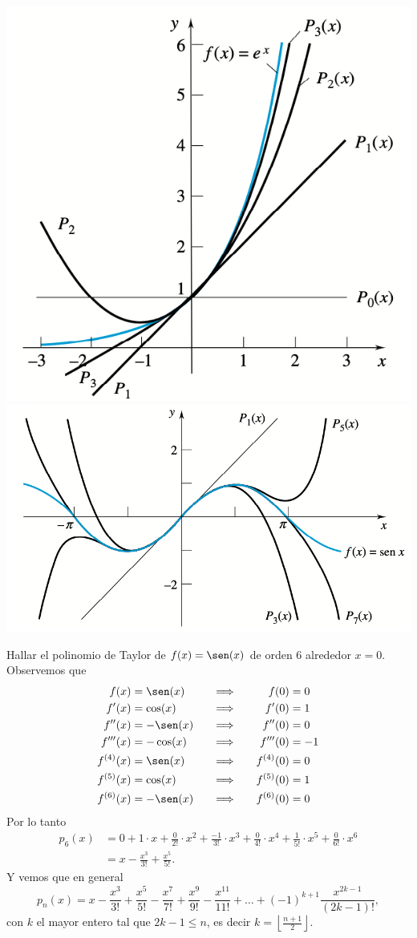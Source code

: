 \begin{center}
  \includegraphics[width=.4\textwidth]{pics/taylor-exp.png}
  \hfil
  \includegraphics[width=.59\textwidth]{pics/taylor-sen.png}
\end{center}

\begin{example}
Hallar el polinomio de Taylor de $f(x) = \sen(x)$ de orden 6 alrededor $x=0$.
Observemos que
\[
\begin{aligned}
 f(x) &= \sen(x)  \quad &\Longrightarrow & &\quad f(0)  &= 0 \\
 f'(x) &= \cos(x) \quad &\Longrightarrow& & \quad f'(0) &= 1 \\
 f''(x) &= -\sen(x) \quad &\Longrightarrow& & \quad f''(0) &= 0 \\
 f'''(x) &= -\cos(x) \quad &\Longrightarrow& & \quad f'''(0) &= -1 \\
 f^{(4)}(x) &= \sen(x) \quad &\Longrightarrow& & \quad f^{(4)}(0) &= 0 \\
 f^{(5)}(x) &= \cos(x) \quad &\Longrightarrow& & \quad f^{(5)}(0) &= 1 \\
 f^{(6)}(x) &= -\sen(x) \quad &\Longrightarrow& & \quad f^{(6)}(0) &= 0 
\end{aligned}
\]
Por lo tanto
\begin{align*}
p_6(x) &= 0 + 1 \cdot x + \frac{0}{2!} \cdot x^2 + \frac{-1}{3!} \cdot x^3 +
          \frac{0}{4!} \cdot x^4 + \frac{1}{5!} \cdot x^5 + \frac{0}{6!} \cdot x^6 \\
       &= x - \frac{x^3}{3!} + \frac{x^5}{5!}.
\end{align*}
Y vemos que en general
\[
p_n(x) =  x - \frac{x^3}{3!} + \frac{x^5}{5!} - \frac{x^7}{7!} + \frac{x^9}{9!} - \frac{x^11}{11!} + \dots
          + (-1)^{k+1} \frac{x^{2k-1}}{(2k-1)!},
\]
con $k$ el mayor entero tal que $2k-1 \le n$, es decir $k = \left\lfloor \frac{n+1}2 \right\rfloor$.
\end{example}

